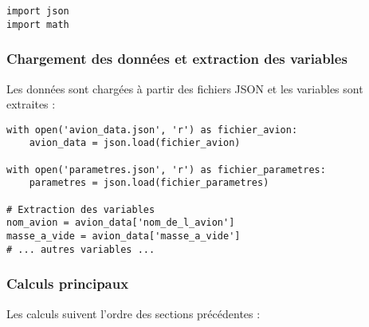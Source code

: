\documentclass[12pt,a4paper]{article}
\begin{document}
\begin{verbatim}
import json
import math
\end{verbatim}

\subsubsection{Chargement des données et extraction des variables}

Les données sont chargées à partir des fichiers JSON et les variables sont extraites :

\begin{verbatim}
with open('avion_data.json', 'r') as fichier_avion:
    avion_data = json.load(fichier_avion)

with open('parametres.json', 'r') as fichier_parametres:
    parametres = json.load(fichier_parametres)

# Extraction des variables
nom_avion = avion_data['nom_de_l_avion']
masse_a_vide = avion_data['masse_a_vide']
# ... autres variables ...
\end{verbatim}

\subsubsection{Calculs principaux}

Les calculs suivent l'ordre des sections précédentes :
\end{document}
